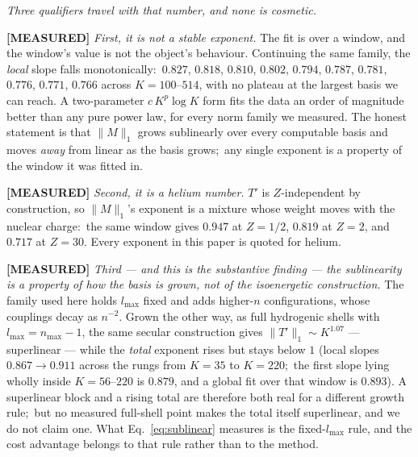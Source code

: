 \documentclass[aps,pra,twocolumn,superscriptaddress,longbibliography]{revtex4-2}
\begin{document}
\emph{Three qualifiers travel with that number, and none is cosmetic.}

\textbf{[MEASURED]} \emph{First, it is not a stable exponent.}  The fit is over a
window, and the window's value is not the object's behaviour.  Continuing the
same family, the \emph{local} slope falls monotonically:\ $0.827$, $0.818$,
$0.810$, $0.802$, $0.794$, $0.787$, $0.781$, $0.776$, $0.771$, $0.766$ across
$K=100$--$514$, with no plateau at the largest basis we can reach.  A two-parameter
$c\,K^{p}\log K$ form fits the data an order of magnitude better than any pure
power law, for every norm family we measured.  The honest statement is that
$\|M\|_1$ grows sublinearly over every computable basis and moves \emph{away}
from linear as the basis grows;\ any single exponent is a property of the window
it was fitted in.

\textbf{[MEASURED]} \emph{Second, it is a helium number.}  $T'$ is
$Z$-independent by construction, so $\|M\|_1$'s exponent is a mixture whose
weight moves with the nuclear charge:\ the same window gives $0.947$ at $Z=1/2$,
$0.819$ at $Z=2$, and $0.717$ at $Z=30$.  Every exponent in this paper is quoted
for helium.

\textbf{[MEASURED]} \emph{Third --- and this is the substantive finding --- the
sublinearity is a property of how the basis is grown, not of the isoenergetic
construction.}  The family used here holds $l_{\max}$ fixed and adds
higher-$n$ configurations, whose couplings decay as $n^{-2}$.  Grown the other
way, as full hydrogenic shells with $l_{\max}=n_{\max}-1$, the same secular
construction gives $\|T'\|_1\sim K^{1.07}$ --- superlinear --- while the
\emph{total} exponent rises but stays below $1$ (local slopes
$0.867\to0.911$ across the rungs from $K=35$ to $K=220$;\ the first
slope lying wholly inside $K=56$--$220$ is $0.879$, and a global fit
over that window is $0.893$).  A superlinear block and a rising total are therefore both
real for a different growth rule;\ but no measured full-shell point makes the
total itself superlinear, and we do not claim one.  What Eq.~\eqref{eq:sublinear} measures is the fixed-$l_{\max}$
rule, and the cost advantage belongs to that rule rather than to the method.
\end{document}
